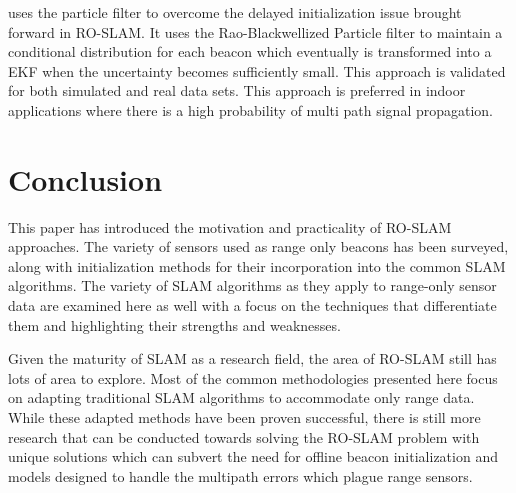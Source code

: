 \documentclass[conference]{IEEEtran}
\begin{document}
	

  	\cite{Blanco2008a} uses the particle filter to overcome the delayed initialization issue brought forward in RO-SLAM. It uses the Rao-Blackwellized Particle filter to maintain a conditional distribution for each beacon which eventually is transformed into a EKF when the uncertainty becomes sufficiently small. This approach is validated for both simulated and real data sets. This approach is preferred in indoor applications where there is a high probability of multi path signal propagation.

	
	
	
	
	
	
	
	
	
	
	
	
	
	
	
	
	\section{Conclusion}
	\label{conclusion}
	This paper has introduced the motivation and practicality of RO-SLAM approaches. The variety of sensors used as range only beacons has been surveyed, along with initialization methods for their incorporation into the common SLAM algorithms. The variety of SLAM algorithms as they apply to range-only sensor data are examined here as well with a focus on the techniques that differentiate them and highlighting their strengths and weaknesses.

	Given the maturity of SLAM as a research field, the area of RO-SLAM still has lots of area to explore. Most of the common methodologies presented here focus on adapting traditional SLAM algorithms to accommodate only range data. While these adapted methods have been proven successful, there is still more research that can be conducted towards solving the RO-SLAM problem with unique solutions which can subvert the need for offline beacon initialization and models designed to handle the multipath errors which plague range sensors.
	
	
	
	
	
	
	
	
	
	
\end{document}
